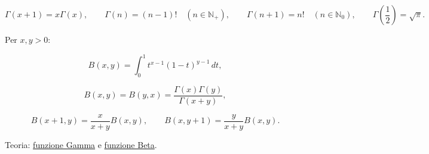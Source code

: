 \[
\displaystyle
\Gamma(x+1)=x\Gamma(x),
\qquad
\Gamma(n)=(n-1)!\quad(n\in\mathbb N_+),
\qquad
\Gamma(n+1)=n!\quad(n\in\mathbb N_0),
\qquad
\Gamma\left(\frac12\right)=\sqrt\pi.
\]

Per \(x,y>0\):

\[
\displaystyle
B(x,y)
=
\int_0^1 t^{x-1}(1-t)^{y-1}\,dt,
\]

\[
\displaystyle
B(x,y)=B(y,x)
=
\frac{\Gamma(x)\Gamma(y)}{\Gamma(x+y)},
\]

\[
\displaystyle
B(x+1,y)=\frac{x}{x+y}B(x,y),
\qquad
B(x,y+1)=\frac{y}{x+y}B(x,y).
\]

Teoria: \href{https://ingegnerismo.it/matematica/funzione-gamma/}{funzione Gamma} e \href{https://ingegnerismo.it/matematica/funzione-beta/}{funzione Beta}.
